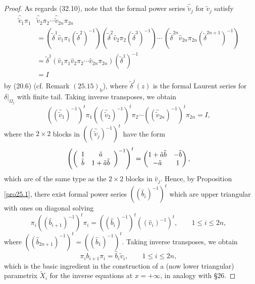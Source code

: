 \documentclass{surv-l}
\theoremstyle{plain}
\theoremstyle{definition}
\numberwithin{equation}{chapter}
\begin{document}
\begin{proof}
As regards (32.10), note that the formal power series ${\hat{\tilde{v}}}_{j}$ for $\tilde{v}_{j}$ satisfy
\begin{align}\label{eq32.12}
{\hat{\tilde{v}}}_{1}\pi_{1}&{\hat{\tilde{v}}}_{2}\pi_{2}\cdots {\hat{\tilde{v}}}_{2n}\pi_{2n}\\ \nonumber
&=(\tilde{\delta}^{1}\hat{v}_{1}\pi_{1}(\tilde{\delta}^{2})^{-1})(\tilde{\delta}^{2}\hat{v}_{2}\pi_{2}(\tilde{\delta}^{3})^{-1})\cdots\ (\tilde{\delta}^{2n}\hat{v}_{2n}\pi_{2n}(\tilde{\delta}^{2n+1})^{-1})\\ \nonumber
&=\tilde{\delta}^{1} (\hat{v}_{1}\pi_{1}\hat{v}_{2}\pi_{2}\cdots\hat{v}_{2n}\pi_{2n})(\tilde{\delta}^{1})^{-1}\\ \nonumber
&=I \nonumber
\end{align}
by (20.6) (cf. Remark $(25.15)_{\mathrm{b}}$), where $\tilde{\delta}^{j}(z)$ is the formal Laurent series for $\delta|_{\Omega_{j}}$ with finite tail. Taking inverse transposes, we obtain
\begin{equation}\label{eq32.13}
(({\hat{\tilde{v}}}_{1})^{-1})^{t}\pi_{1}(({\hat{\tilde{v}}}_{2})^{-1})^{t}\pi_{2}\cdots (({\hat{\tilde{v}}}_{2n})^{-1})^{t}\pi_{2n}=I,
\end{equation}
where the $2\times 2$ blocks in $(({\hat{\tilde{v}}}_{j})^{-1})^{t}$ have the form
\begin{equation*}
\left(\left(\begin{array}{cc}
1 & \tilde{a}  \\
\tilde{b} & 1+\tilde{a}\tilde{b}
\end{array}\right)^{-1}\right)^{t}=\left(\begin{array}{@{}cc@{}}
1+\tilde{a}\tilde{b} & -\tilde{b}\\
-\tilde{a} & 1
\end{array}\right),
\end{equation*}
which are of the same type as the $2\times 2$ blocks in $\hat{v}_{j}$. Hence, by Proposition \ref{pro25.1}, there exist formal power series $((\hat{b}_{i})^{-1})^{t}$ which are upper triangular with ones on diagonal solving
\begin{equation}\label{eq32.14}
\pi_{i}((\hat{b}_{i+1})^{-1})^{t}\pi_{i}=((\hat{b}_{i})^{-1})^{t}((\hat{v}_{i})^{-1})^{t},\qquad 1\leq i\leq 2n,
\end{equation}
where $((\hat{b}_{2n+1})^{-1})^{t}=((\hat{b}_{1})^{-1})^{t}$. Taking inverse transposes, we obtain
\begin{equation}\label{eq32.15}
\pi_{i}\hat{b}_{i+1}\pi_{i}=\hat{b}_{i}\tilde{v}_{i},\qquad 1\leq i\leq 2n,
\end{equation}
which is the basic ingredient in the construction of a (now lower triangular) parametrix $\tilde{X}_{i}$ for the inverse equations at $ x=+\infty$, in analogy with \S 26. \qquad
\end{proof}
\end{document}

